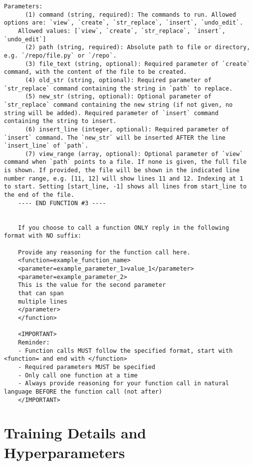 \begin{tcolorbox}[title={SWE-smith Prompt},
    colback=white, colframe=black, fonttitle=\bfseries,
    breakable, sharp corners=south, enhanced jigsaw]
\begin{Verbatim}[breaklines=true, obeytabs=false,breaksymbol={},breakindent=0pt,fontsize=\tiny]
    Parameters:
      (1) command (string, required): The commands to run. Allowed options are: `view`, `create`, `str_replace`, `insert`, `undo_edit`.
    Allowed values: [`view`, `create`, `str_replace`, `insert`, `undo_edit`]
      (2) path (string, required): Absolute path to file or directory, e.g. `/repo/file.py` or `/repo`.
      (3) file_text (string, optional): Required parameter of `create` command, with the content of the file to be created.
      (4) old_str (string, optional): Required parameter of `str_replace` command containing the string in `path` to replace.
      (5) new_str (string, optional): Optional parameter of `str_replace` command containing the new string (if not given, no string will be added). Required parameter of `insert` command containing the string to insert.
      (6) insert_line (integer, optional): Required parameter of `insert` command. The `new_str` will be inserted AFTER the line `insert_line` of `path`.
      (7) view_range (array, optional): Optional parameter of `view` command when `path` points to a file. If none is given, the full file is shown. If provided, the file will be shown in the indicated line number range, e.g. [11, 12] will show lines 11 and 12. Indexing at 1 to start. Setting [start_line, -1] shows all lines from start_line to the end of the file.
    ---- END FUNCTION #3 ----
    
    
    If you choose to call a function ONLY reply in the following format with NO suffix:
    
    Provide any reasoning for the function call here.
    <function=example_function_name>
    <parameter=example_parameter_1>value_1</parameter>
    <parameter=example_parameter_2>
    This is the value for the second parameter
    that can span
    multiple lines
    </parameter>
    </function>
    
    <IMPORTANT>
    Reminder:
    - Function calls MUST follow the specified format, start with <function= and end with </function>
    - Required parameters MUST be specified
    - Only call one function at a time
    - Always provide reasoning for your function call in natural language BEFORE the function call (not after)
    </IMPORTANT>
  \end{Verbatim}
  \end{tcolorbox}

\section{Training Details and Hyperparameters}
\label{app:training_details}

